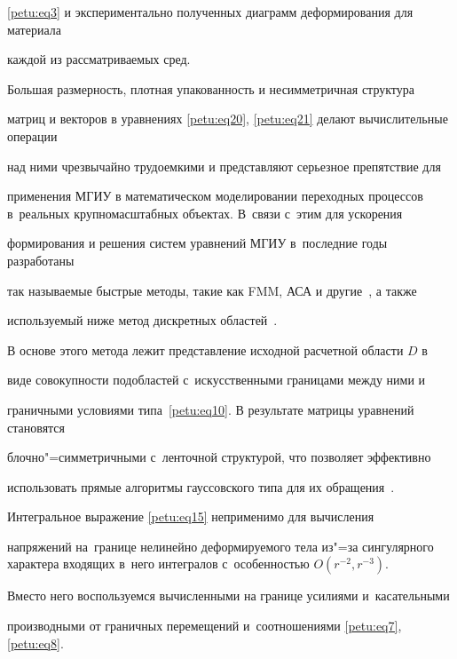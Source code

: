 \eqref{petu:eq3} и экспериментально полученных диаграмм деформирования для материала

каждой из рассматриваемых сред.



Большая размерность, плотная упакованность и несимметричная структура

матриц и векторов в уравнениях \eqref{petu:eq20}, \eqref{petu:eq21} делают вычислительные операции

над ними чрезвычайно трудоемкими и представляют серьезное препятствие для

применения МГИУ в математическом моделировании переходных процессов в~реальных крупномасштабных объектах. В~связи с~этим для ускорения

формирования и решения систем уравнений МГИУ в~последние годы разработаны

так называемые быстрые методы, такие как FMM, АСА и другие~\cite{petu:bib6}, а также

используемый ниже метод дискретных областей~\cite{petu:bib14,petu:bib18}.



В основе этого метода лежит представление исходной расчетной области $D$ в~

виде совокупности подобластей с~искусственными границами между ними и

граничными условиями типа~\eqref{petu:eq10}. В результате матрицы уравнений становятся

блочно"=симметричными с~ленточной структурой, что позволяет эффективно

использовать прямые алгоритмы гауссовского типа для их обращения~\cite{petu:bib19}.







 Интегральное выражение \eqref{petu:eq15} неприменимо для вычисления

нап\-ря\-же\-ний на~границе нелинейно деформируемого тела из"=за сингулярного характера входящих в~него интегралов с~особенностью $O(r^{-2}, r^{-3})$.

Вместо него воспользуемся вычисленными на границе усилиями и~касательными

производными от граничных перемещений и~соотношениями \eqref{petu:eq7}, \eqref{petu:eq8}.




